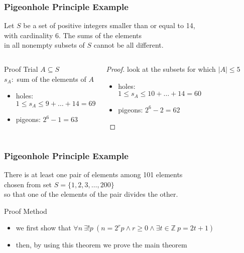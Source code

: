 \documentclass[dvipsnames]{beamer}
\begin{document}
\begin{frame}
  \frametitle{Pigeonhole Principle Example}

  \begin{theorem}
    Let $S$ be a set of positive integers smaller than or equal to 14,\\
    with cardinality 6. The sums of the elements\\
    in all nonempty subsets of $S$ cannot be all different.
  \end{theorem}

  \pause
  \begin{columns}[t]
    \begin{block}{Proof Trial}
      $A \subseteq S$\\
      $s_A:$ sum of the elements of $A$

      \pause
      \begin{itemize}
        \item holes:\\
          $1 \leq s_A \leq 9 + \dots + 14 = 69$
        \item pigeons: $2^6 - 1 = 63$
      \end{itemize}
    \end{block}

    \pause
    \begin{proof}
      look at the subsets for which $|A| \leq 5$

      \pause
      \begin{itemize}
        \item holes:\\
          $1 \leq s_A \leq 10 + \dots + 14 = 60$
        \item pigeons: $2^6 - 2 = 62$
      \end{itemize}
    \end{proof}
  \end{columns}
\end{frame}

\begin{frame}
  \frametitle{Pigeonhole Principle Example}

  \begin{theorem}
    There is at least one pair of elements among 101 elements\\
    chosen from set $S = \{1,2,3,\dots,200\}$\\
    so that one of the elements of the pair divides the other.
  \end{theorem}

  \pause
  \begin{block}{Proof Method}
    \begin{itemize}
      \item we first show that
         $\forall n~\exists ! p~(n = 2^r p \wedge r \geq 0 \wedge \exists t \in \mathbb Z~p = 2t + 1)$\\

      \item then, by using this theorem we prove the main theorem
    \end{itemize}
  \end{block}
\end{frame}
\end{document}
